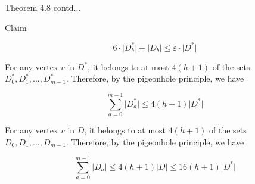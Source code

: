 \documentclass{beamer}
\begin{document}
\begin{frame}{Theorem 4.8 contd...}


\begin{exampleblock}{Claim}

    \begin{equation}
        6 \cdot \lvert D_b^* \rvert + \lvert D_b \rvert \le \varepsilon \cdot \lvert D^* \rvert        
    \end{equation}


    

\end{exampleblock}

\begin{exampleblock}{}

    For any vertex $v$ in $D^*$, it belongs to at most $4(h + 1)$ of the sets
    $D_0^*, D^*_1,...,D^*_{m - 1}$. Therefore, by the pigeonhole principle, we have

    \begin{equation}    
        \displaystyle \sum_{a=0}^{m-1} \lvert D_a^* \rvert \le 4( h+1 )\lvert D^* \rvert         
    \end{equation}

    For any vertex $v$ in $D$, it belongs to at most $4(h + 1)$ of the sets
    $D_0, D_1,...,D_{m - 1}$. Therefore, by the pigeonhole principle, we have

    \begin{equation}    
        \displaystyle \sum_{a=0}^{m-1} \lvert D_a \rvert \le 4( h+1 )\lvert D \rvert \le 16( h+1 )\lvert D^* \rvert         
    \end{equation}
    

\end{exampleblock}

\end{frame}
\end{document}
